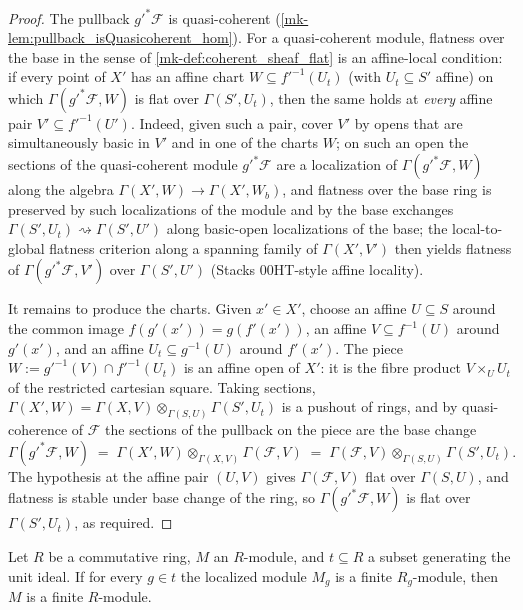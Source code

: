 \begin{proof}
  \leanok{}
  The pullback \(g'^*\mathcal{F}\) is quasi-coherent
  (\ref{mk-lem:pullback_isQuasicoherent_hom}).  For a quasi-coherent module,
  flatness over the base in the sense of \ref{mk-def:coherent_sheaf_flat} is an
  affine-local condition: if every point of \(X'\) has an affine chart
  \(W \subseteq f'^{-1}(U_t)\) (with \(U_t \subseteq S'\) affine) on which
  \(\Gamma(g'^*\mathcal{F}, W)\) is flat over \(\Gamma(S', U_t)\), then the
  same holds at \emph{every} affine pair
  \(V' \subseteq f'^{-1}(U')\).  Indeed, given such a pair, cover \(V'\) by
  opens that are simultaneously basic in \(V'\) and in one of the charts
  \(W\); on such an open the sections of the quasi-coherent module
  \(g'^*\mathcal{F}\) are a localization of \(\Gamma(g'^*\mathcal{F}, W)\)
  along the algebra \(\Gamma(X', W) \to \Gamma(X', W_b)\), and flatness over
  the base ring is preserved by such localizations of the module and by the
  base exchanges \(\Gamma(S', U_t) \rightsquigarrow \Gamma(S', U')\) along
  basic-open localizations of the base; the local-to-global flatness
  criterion along a spanning family of \(\Gamma(X', V')\) then yields
  flatness of \(\Gamma(g'^*\mathcal{F}, V')\) over \(\Gamma(S', U')\)
  (Stacks 00HT-style affine locality).

  It remains to produce the charts.  Given \(x' \in X'\), choose an affine
  \(U \subseteq S\) around the common image \(f(g'(x')) = g(f'(x'))\), an
  affine \(V \subseteq f^{-1}(U)\) around \(g'(x')\), and an affine
  \(U_t \subseteq g^{-1}(U)\) around \(f'(x')\).  The piece
  \(W := g'^{-1}(V) \cap f'^{-1}(U_t)\) is an affine open of \(X'\): it is
  the fibre product \(V \times_U U_t\) of the restricted cartesian square.
  Taking sections, \(\Gamma(X', W) =
  \Gamma(X, V) \otimes_{\Gamma(S, U)} \Gamma(S', U_t)\) is a pushout of
  rings, and by quasi-coherence of \(\mathcal{F}\) the sections of the
  pullback on the piece are the base change
  \[
    \Gamma(g'^*\mathcal{F}, W)
      \;=\; \Gamma(X', W) \otimes_{\Gamma(X, V)} \Gamma(\mathcal{F}, V)
      \;=\; \Gamma(\mathcal{F}, V) \otimes_{\Gamma(S, U)} \Gamma(S', U_t).
  \]
  The hypothesis at the affine pair \((U, V)\) gives
  \(\Gamma(\mathcal{F}, V)\) flat over \(\Gamma(S, U)\), and flatness is
  stable under base change of the ring, so \(\Gamma(g'^*\mathcal{F}, W)\) is
  flat over \(\Gamma(S', U_t)\), as required.
\end{proof}

\begin{lemma}
  \label{mk-lem:module_finite_of_localizationSpan_mathlib}
  \mathlibok

  Let \(R\) be a commutative ring, \(M\) an \(R\)-module, and
  \(t \subseteq R\) a subset generating the unit ideal.  If for every
  \(g \in t\) the localized module \(M_g\) is a finite \(R_g\)-module, then
  \(M\) is a finite \(R\)-module.
\end{lemma}

